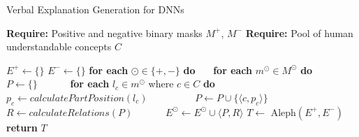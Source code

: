 \begin{algorithm}[t]
  \caption{\label{alg:ex_gen} Verbal Explanation Generation for DNNs}
  \begin{algorithmic}[1]
    \State \textbf{Require:} Positive and negative binary masks $M^+$, $M^-$
    \State \textbf{Require:} Pool of human understandable concepts $C$
    
    \State $E^+ \gets \{\}$
    \State $E^- \gets \{\}$
    \State \textbf{for each} $\odot \in \{+, -\}$ \textbf{do}
    \State ~~~\textbf{for each} $m^\odot \in M^\odot$ \textbf{do}
    \State ~~~~~~$P \gets \{\}$
    \State ~~~~~~\textbf{for each} $l_c \in m^\odot$ where $c \in C$ \textbf{do}
    \State ~~~~~~~~~$p_c \gets calculatePartPosition(l_c)$
    \State ~~~~~~~~~$P \gets P \cup \{\langle c, p_c \rangle\}$
    \State ~~~~~~$R \gets calculateRelations(P)$
    \State ~~~~~~$E^\odot \gets E^\odot \cup {\langle P, R \rangle}$
    \State $T \leftarrow$ Aleph$(E^+, E^-)$
    \State \textbf{return} $T$
  \end{algorithmic}
\end{algorithm}


